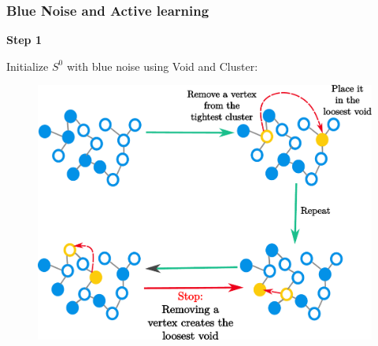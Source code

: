 \documentclass[11pts]{beamer}
\begin{document}


\begin{frame}%

\frametitle{Blue Noise and Active learning}
\textbf{Step 1}

 Initialize $S^{0}$ with blue noise using Void and Cluster:

\begin{figure}
    \centering
    \includegraphics[scale=0.35]{IM/VA.pdf}
   
\end{figure}



\end{frame}

\end{document}
